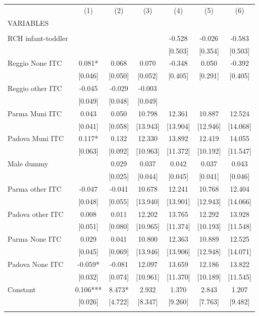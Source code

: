 \begin{tabular}{lcccccc} \hline
 & (1) & (2) & (3) & (4) & (5) & (6) \\
VARIABLES &  &  &  &  &  &  \\ \hline
 &  &  &  &  &  &  \\
RCH infant-toddler &  &  &  & -0.528 & -0.026 & -0.583 \\
 &  &  &  & [0.503] & [0.354] & [0.503] \\
Reggio None ITC & 0.081* & 0.068 & 0.070 & -0.348 & 0.050 & -0.392 \\
 & [0.046] & [0.050] & [0.052] & [0.405] & [0.291] & [0.405] \\
Reggio other ITC & -0.045 & -0.029 & -0.003 &  &  &  \\
 & [0.049] & [0.048] & [0.049] &  &  &  \\
Parma Muni ITC & 0.043 & 0.050 & 10.798 & 12.361 & 10.887 & 12.524 \\
 & [0.041] & [0.058] & [13.943] & [13.904] & [12.946] & [14.068] \\
Padova Muni ITC & 0.117* & 0.132 & 12.330 & 13.892 & 12.419 & 14.055 \\
 & [0.063] & [0.092] & [10.963] & [11.372] & [10.192] & [11.547] \\
Male dummy &  & 0.029 & 0.037 & 0.042 & 0.037 & 0.043 \\
 &  & [0.025] & [0.044] & [0.045] & [0.041] & [0.046] \\
Parma other ITC & -0.047 & -0.041 & 10.678 & 12.241 & 10.768 & 12.404 \\
 & [0.048] & [0.055] & [13.940] & [13.901] & [12.943] & [14.066] \\
Padova other ITC & 0.008 & 0.011 & 12.202 & 13.765 & 12.292 & 13.928 \\
 & [0.051] & [0.080] & [10.965] & [11.374] & [10.193] & [11.548] \\
Parma None ITC & 0.029 & 0.041 & 10.800 & 12.363 & 10.889 & 12.525 \\
 & [0.045] & [0.069] & [13.946] & [13.906] & [12.948] & [14.071] \\
Padova None ITC & -0.059* & -0.081 & 12.097 & 13.659 & 12.186 & 13.822 \\
 & [0.032] & [0.074] & [10.961] & [11.370] & [10.189] & [11.545] \\
Constant & 0.106*** & 8.473* & 2.932 & 1.370 & 2.843 & 1.207 \\
 & [0.026] & [4.722] & [8.347] & [9.260] & [7.763] & [9.482] \\
 &  &  &  &  &  &  \\

\end{tabular}
